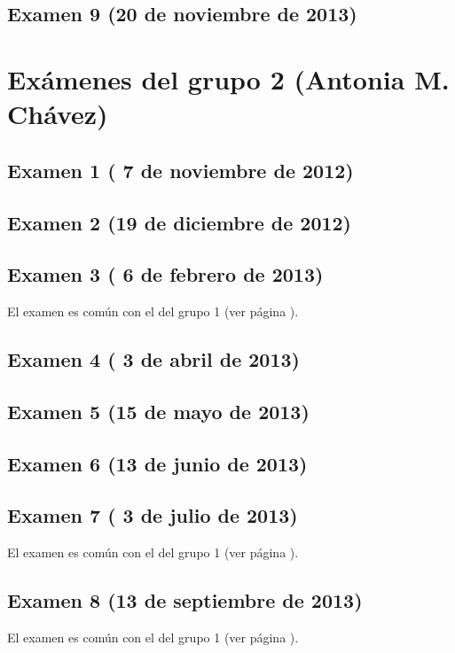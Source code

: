 \documentclass[a4paper,12pt,twoside]{book}
\begin{document}
\subsection{Examen 9 (20 de noviembre de 2013)}
\label{examen_12_13_2_9}

\section{Exámenes del grupo 2 (Antonia M. Chávez)}
\subsection{Examen 1 ( 7 de noviembre de 2012)}
\subsection{Examen 2 (19 de diciembre de 2012)}
\subsection{Examen 3 ( 6 de febrero de 2013)}
El examen es común con el del grupo 1 (ver página \pageref{examen_12_13_2_3}).
\subsection{Examen 4 ( 3 de abril de 2013)}
\subsection{Examen 5 (15 de mayo de 2013)}
\subsection{Examen 6 (13 de junio de 2013)}
\label{examen_12_13_1_6}
\subsection{Examen 7 ( 3 de julio de 2013)}
El examen es común con el del grupo 1 (ver página \pageref{examen_12_13_2_7}).
\subsection{Examen 8 (13 de septiembre de 2013)}
El examen es común con el del grupo 1 (ver página \pageref{examen_12_13_2_8}).
\end{document}
